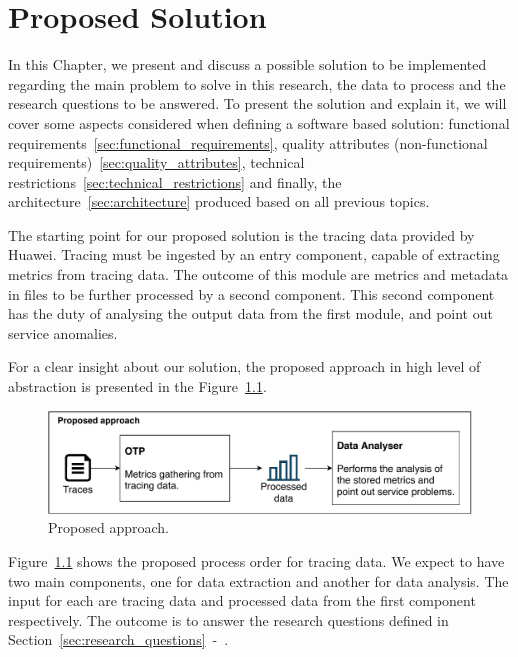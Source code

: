 \glsresetall
\chapter{Proposed Solution}
\label{chap:proposed_solution}

In this Chapter, we present and discuss a possible solution to be implemented regarding the main problem to solve in this research, the data to process and the research questions to be answered. To present the solution and explain it, we will cover some aspects considered when defining a software based solution: functional requirements~\ref{sec:functional_requirements}, quality attributes (non-functional requirements)~\ref{sec:quality_attributes}, technical restrictions~\ref{sec:technical_restrictions} and finally, the architecture~\ref{sec:architecture} produced based on all previous topics.

The starting point for our proposed solution is the tracing data provided by Huawei. Tracing must be ingested by an entry component, capable of extracting metrics from tracing data. The outcome of this module are metrics and metadata in files to be further processed by a second component. This second component has the duty of analysing the output data from the first module, and point out service anomalies.

For a clear insight about our solution, the proposed approach in high level of abstraction is presented in the Figure~\ref{fig:proposed_approach}.

\begin{figure}[H]
    \centering
    \includegraphics[width=1.00\textwidth]{images/proposed_solution.pdf}
    \caption{Proposed approach.}
    \label{fig:proposed_approach}
\end{figure}

Figure~\ref{fig:proposed_approach} shows the proposed process order for tracing data. We expect to have two main components, one for data extraction and another for data analysis. The input for each are tracing data and processed data from the first component respectively. The outcome is to answer the research questions defined in Section~\ref{sec:research_questions}~-~.

